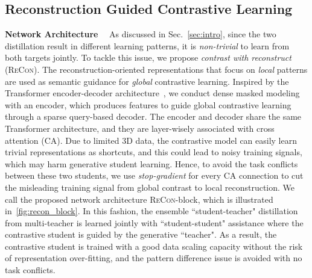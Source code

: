 \documentclass{article}
\theoremstyle{plain}
\theoremstyle{definition}
\theoremstyle{remark}
\def\recon{{\scshape ReCon}}
\begin{document}
\subsection{Reconstruction Guided Contrastive Learning}\label{sec:method_impl}
\vspace{-6pt}
\textbf{Network Architecture}~~ As discussed in Sec.~\ref{sec:intro}, since the two distillation result in different learning patterns, it is \textit{non-trivial} to learn from both targets jointly. 
To tackle this issue, we propose \textit{contrast with reconstruct} (\recon). The reconstruction-oriented representations that focus on \textit{local} patterns are used as semantic guidance for \textit{global} contrastive learning. 
Inspired by the Transformer encoder-decoder architecture~\citep{AttentionIsAllYouNeed}, we conduct dense masked modeling with an encoder, which produces features to guide global contrastive learning through a sparse query-based decoder. 
The encoder and decoder share the same Transformer architecture, and they are layer-wisely associated with cross attention (CA). 
Due to limited 3D data, the contrastive model can easily learn trivial representations as shortcuts, and this could lead to noisy training signals, which may harm generative student learning.
Hence, to avoid the task conflicts between these two students, we use \textit{stop-gradient} for every CA connection to cut the misleading training signal from global contrast to local reconstruction.
We call the proposed network architecture \recon-block, which is illustrated in~\cref{fig:recon_block}. 
In this fashion, the ensemble ``student-teacher" distillation from multi-teacher is learned jointly with ``student-student" assistance where the contrastive student is guided by the generative ``teacher".
As a result, the contrastive student is trained with a good data scaling capacity without the risk of representation over-fitting, and the pattern difference issue is avoided with no task conflicts.
\end{document}
